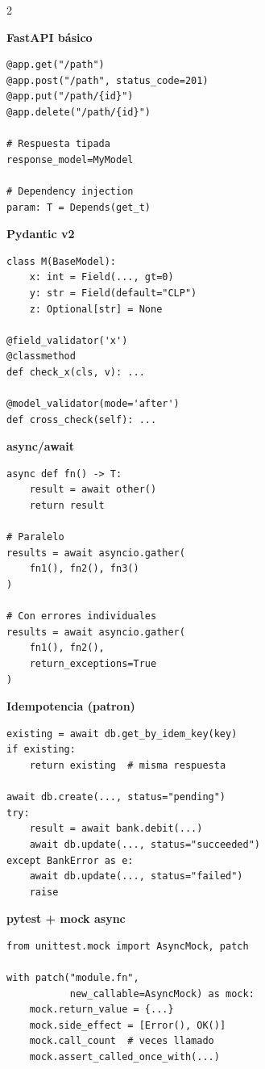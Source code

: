 \documentclass[11pt,a4paper]{article}
\begin{document}
\begin{multicols}{2}

\textbf{\textcolor{pyblue}{FastAPI básico}}
\begin{lstlisting}[style=python,numbers=none]
@app.get("/path")
@app.post("/path", status_code=201)
@app.put("/path/{id}")
@app.delete("/path/{id}")

# Respuesta tipada
response_model=MyModel

# Dependency injection
param: T = Depends(get_t)
\end{lstlisting}

\textbf{\textcolor{pyblue}{Pydantic v2}}
\begin{lstlisting}[style=python,numbers=none]
class M(BaseModel):
    x: int = Field(..., gt=0)
    y: str = Field(default="CLP")
    z: Optional[str] = None

@field_validator('x')
@classmethod
def check_x(cls, v): ...

@model_validator(mode='after')
def cross_check(self): ...
\end{lstlisting}

\textbf{\textcolor{pyblue}{async/await}}
\begin{lstlisting}[style=python,numbers=none]
async def fn() -> T:
    result = await other()
    return result

# Paralelo
results = await asyncio.gather(
    fn1(), fn2(), fn3()
)

# Con errores individuales
results = await asyncio.gather(
    fn1(), fn2(),
    return_exceptions=True
)
\end{lstlisting}

\columnbreak

\textbf{\textcolor{pyorange}{Idempotencia (patron)}}
\begin{lstlisting}[style=python,numbers=none]
existing = await db.get_by_idem_key(key)
if existing:
    return existing  # misma respuesta

await db.create(..., status="pending")
try:
    result = await bank.debit(...)
    await db.update(..., status="succeeded")
except BankError as e:
    await db.update(..., status="failed")
    raise
\end{lstlisting}

\textbf{\textcolor{pyorange}{pytest + mock async}}
\begin{lstlisting}[style=python,numbers=none]
from unittest.mock import AsyncMock, patch

with patch("module.fn",
           new_callable=AsyncMock) as mock:
    mock.return_value = {...}
    mock.side_effect = [Error(), OK()]
    mock.call_count  # veces llamado
    mock.assert_called_once_with(...)
\end{lstlisting}


\end{multicols}
\end{document}
